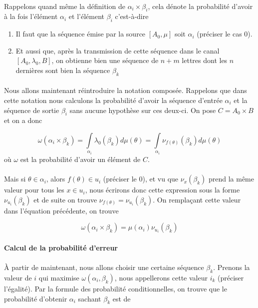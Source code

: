 	\paragraph{}
	Rappelons quand même la définition de $\alpha_i \times \beta_i$, cela dénote la probabilité d'avoir à la fois l'élément $\alpha_i$ et l'élément $\beta_i$ c'est-à-dire
	\begin{enumerate}
		\item Il faut que la séquence émise par la source $[A_0,\mu]$ soit $\alpha_i$ (préciser le cas 0).
		\item Et aussi que, après la transmission de cette séquence dans le canal $[A_0,\lambda_0,B]$, on obtienne bien une séquence de $n+m$ lettres dont les $n$ 
		dernières sont bien la séquence $\beta_k$
	\end{enumerate} 
	
	\paragraph{}
	Nous allons maintenant réintroduire la notation composée. Rappelons que dans cette notation nous calculons la probabilité d'avoir la séquence
	d'entrée $\alpha_i$ et la séquence de sortie $\beta_i$ sans aucune hypothèse sur ces deux-ci. On pose $C = A_0 \times B$ et on a donc
	
	
	\[\omega(\alpha_i\times\beta_k)=\int\limits_{\alpha_i}\lambda_0(\beta_k)d\mu(\theta)=\int\limits_{\alpha_i}\nu_{f(\theta)}(\beta_k)d\mu(\theta)\]
	où $\omega$ est la probabilité d'avoir un élément de $C$.
	
	\paragraph{}
	Mais si $\theta \in \alpha_i$, alors $f(\theta) \in u_i$ (préciser le 0), et vu que $\nu_x(\beta_k)$ prend la même valeur
	pour tous les $x \in u_i$, nous écrirons donc cette expression sous la forme $\nu_{u_i}(\beta_k)$ et de suite on trouve $\nu_{f(\theta)}=\nu_{u_i}(\beta_k)$.
	On remplaçant cette valeur dans l'équation précédente, on trouve
	
	\[\omega(\alpha_i\times\beta_k)=\mu(\alpha_i)\nu_{u_i}(\beta_k)\]
	
	\paragraph{Calcul de la probabilité d'erreur}
	
	\paragraph{}
	À partir de maintenant, nous allons choisir une certaine séquence $\beta_k$.
	Prenons la valeur de $i$ qui maximise $\omega(\alpha_i,\beta_k)$, nous appellerons cette valeur $i_k$ (préciser l'égalité).
	Par la formule des probabilité conditionnelles, on trouve que le probabilité d'obtenir $\alpha_i$ sachant $\beta_k$ est de 
	
